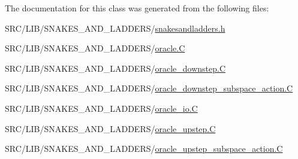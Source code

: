 The documentation for this class was generated from the following files\+:\begin{DoxyCompactItemize}
\item 
S\+R\+C/\+L\+I\+B/\+S\+N\+A\+K\+E\+S\+\_\+\+A\+N\+D\+\_\+\+L\+A\+D\+D\+E\+R\+S/\mbox{\hyperlink{snakesandladders_8h}{snakesandladders.\+h}}\item 
S\+R\+C/\+L\+I\+B/\+S\+N\+A\+K\+E\+S\+\_\+\+A\+N\+D\+\_\+\+L\+A\+D\+D\+E\+R\+S/\mbox{\hyperlink{oracle_8_c}{oracle.\+C}}\item 
S\+R\+C/\+L\+I\+B/\+S\+N\+A\+K\+E\+S\+\_\+\+A\+N\+D\+\_\+\+L\+A\+D\+D\+E\+R\+S/\mbox{\hyperlink{oracle__downstep_8_c}{oracle\+\_\+downstep.\+C}}\item 
S\+R\+C/\+L\+I\+B/\+S\+N\+A\+K\+E\+S\+\_\+\+A\+N\+D\+\_\+\+L\+A\+D\+D\+E\+R\+S/\mbox{\hyperlink{oracle__downstep__subspace__action_8_c}{oracle\+\_\+downstep\+\_\+subspace\+\_\+action.\+C}}\item 
S\+R\+C/\+L\+I\+B/\+S\+N\+A\+K\+E\+S\+\_\+\+A\+N\+D\+\_\+\+L\+A\+D\+D\+E\+R\+S/\mbox{\hyperlink{oracle__io_8_c}{oracle\+\_\+io.\+C}}\item 
S\+R\+C/\+L\+I\+B/\+S\+N\+A\+K\+E\+S\+\_\+\+A\+N\+D\+\_\+\+L\+A\+D\+D\+E\+R\+S/\mbox{\hyperlink{oracle__upstep_8_c}{oracle\+\_\+upstep.\+C}}\item 
S\+R\+C/\+L\+I\+B/\+S\+N\+A\+K\+E\+S\+\_\+\+A\+N\+D\+\_\+\+L\+A\+D\+D\+E\+R\+S/\mbox{\hyperlink{oracle__upstep__subspace__action_8_c}{oracle\+\_\+upstep\+\_\+subspace\+\_\+action.\+C}}\end{DoxyCompactItemize}
